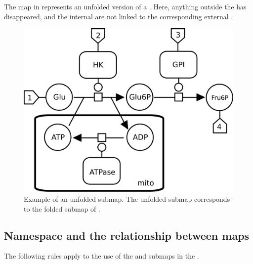 The map in  represents an unfolded version of a
.  Here, anything outside the  has
disappeared, and the internal  are not linked to the
corresponding external .

\begin{figure}[htb]
  \centering
  \includegraphics[scale = 0.35]{examples/submap-dissociated}
  \caption{Example of an unfolded submap. The unfolded submap corresponds to the folded submap of .}
  \label{fig:techref:submap-unfolded}
\end{figure}

\subsection{Namespace and the relationship between maps}

The following rules apply to the use of the  and
submaps in the \PDl{}.


